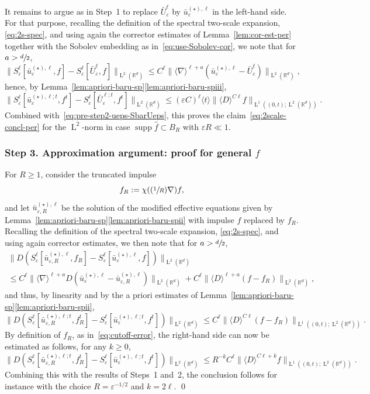 \documentclass[10pt]{amsart}
\newcommand{\Psfrac}[2]{(\sfrac{#1}{#2})}
\theoremstyle{plain}
\theoremstyle{definition}
\numberwithin{equation}{section}
\newcommand{\e}{\varepsilon}
\newcommand{\R}{\mathbb R}
\newcommand{\Ld}{\operatorname{L}}
\newcommand{\supp}{\operatorname{supp}}
\newcommand{\step}[1]{\subsubsection*{Step \textup #1}}
\begin{document}
It remains to argue as in Step~1 to replace $\bar U_\e^\ell$ by $\bar u_\e^{(\star),\ell}$ in the left-hand side.
For that purpose, recalling the definition of the spectral two-scale expansion, \cf \eqref{eq:2s-spec}, and using again the corrector estimates of Lemma~\ref{lem:cor-est-per} together with the Sobolev embedding as in~\eqref{eq:use-Sobolev-cor}, we note that for $a>\sfrac d2$,
\begin{equation*}
\|S_\e^{\ell}[\bar u_\e^{(\star),\ell},f]-S_\e^{\ell}[\bar U_\e^{\ell},f]\|_{\Ld^2(\R^d)}
\le C^\ell\|\langle\nabla\rangle^{\ell+a} (\bar u_\e^{(\star),\ell}-\bar U_\e^{\ell})\|_{\Ld^2(\R^d)},
\end{equation*}
hence, by Lemma~\ref{lem:apriori-baru-sp}\eqref{lem:apriori-baru-spiii},
\begin{equation*}
\|S_\e^{\ell}[\bar u_\e^{(\star),\ell;t},f^t]-S_\e^{\ell}[\bar U_\e^{\ell;t},f^t]\|_{\Ld^2(\R^d)}
\le (\e C)^\ell\langle t\rangle\|\langle D\rangle^{C\ell}f\|_{\Ld^1((0,t);\Ld^2(\R^d))}.
\end{equation*}
Combined with~\eqref{eq:pre-step2-ueps-SbarUeps}, this proves the claim~\eqref{eq:2scale-concl-per} for the $\Ld^2$-norm in case $\supp\hat f\subset B_R$ with $\e R\ll1$.

\step{3. Approximation argument: proof for general $f$}
For $R\ge1$, consider the truncated impulse
\[f_R:=\chi(\Psfrac1R\nabla)f,\]
and let $\bar u_{\e,R}^{(\star),\ell}$ be the solution of the modified effective equations given by Lem\-ma~\ref{lem:apriori-baru-sp}\eqref{lem:apriori-baru-spii} with impulse $f$ replaced by $f_R$.
Recalling the definition of the spectral two-scale expansion, \cf \eqref{eq:2s-spec}, and using again corrector estimates, we then note that for $a>\sfrac d2$,
\begin{multline*}
\|D(S_\e^{\ell}[\bar u_{\e,R}^{(\star),\ell},f_R]-S_\e^{\ell}[\bar u_\e^{(\star),\ell},f])\|_{\Ld^2(\R^d)}\\
\le C^\ell\|\langle\nabla\rangle^{\ell+a} D(\bar u_\e^{(\star),\ell}-\bar u_{\e,R}^{(\star),\ell})\|_{\Ld^2(\R^d)}
+C^\ell\|\langle D\rangle^{\ell+a}(f-f_R)\|_{\Ld^2(\R^d)},
\end{multline*}
and thus, by linearity and by the a priori estimates of Lemma~\ref{lem:apriori-baru-sp}\eqref{lem:apriori-baru-spii},
\begin{equation*}
\|D(S_\e^{\ell}[\bar u_{\e,R}^{(\star),\ell;t},f_R^t]-S_\e^{\ell}[\bar u_\e^{(\star),\ell;t},f^t])\|_{\Ld^2(\R^d)}
\le C^\ell\|{\langle D\rangle^{C\ell}}(f-f_R)\|_{\Ld^1((0,t);\Ld^2(\R^d))}.
\end{equation*}
By definition of $f_R$, as in~\eqref{eq:cutoff-error}, the right-hand side can now be estimated as follows, for any $k\ge0$,
\begin{equation*}
\|D(S_\e^{\ell}[\bar u_{\e,R}^{(\star),\ell;t},f_R^t]-S_\e^{\ell}[\bar u_\e^{(\star),\ell;t},f^t])\|_{\Ld^2(\R^d)}
\le R^{-k}C^\ell\|\langle D\rangle^{C\ell+k}f\|_{\Ld^1((0,t);\Ld^2(\R^d))}.
\end{equation*}
Combining this with the results of Steps~1 and~2, the conclusion follows for instance with the choice $R=\e^{-1/2}$ and $k=2\ell$.
\qed
\end{document}
